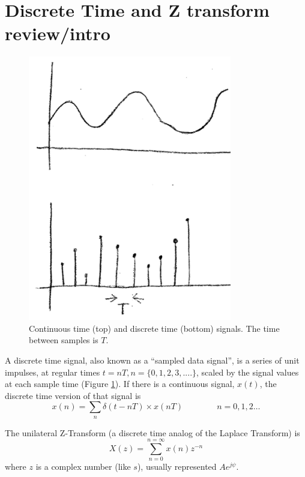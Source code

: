 \section{Discrete Time and Z transform review/intro}

\begin{figure}[h]
\includegraphics[width=3.5in]{figs11/cont_disc_sigsa.png}	%
\caption{Continuous time (top) and discrete time (bottom) signals. The time between samples is $T$.}\label{FigContinuousDiscreteSignals}
\end{figure}


A discrete time signal, also known as a ``sampled data signal'', is a series of unit impulses,
at regular times $t=nT, n=\{0,1,2,3,....\}$,
scaled by the signal values at each sample time (Figure \ref{FigContinuousDiscreteSignals}).
If there is a continuous signal, $x(t)$, the discrete time version of that signal is
\[
x(n) = \sum_n \delta(t-nT)\times x(nT)  \qquad \qquad n = 0,1,2 \dots
\]

The unilateral Z-Transform (a discrete time analog of the Laplace Transform) is
\[
X(z) = \sum_{n=0}^{n=\infty} x(n)z^{-n}
\]
where $z$ is a complex number (like $s$), usually represented $Ae^{j\psi}$.


